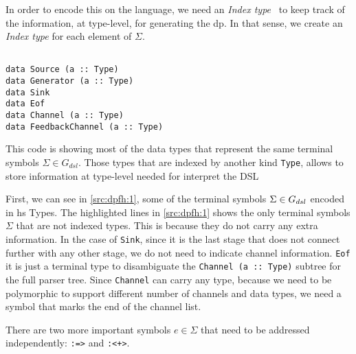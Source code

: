 In order to encode this on the language, we need an \emph{Index type}~\cite{type-index} to keep track of the information, at type-level, for generating the \acrshort{dp}. 
In that sense, we create an \emph{Index type} for each element of $\Sigma$.

\begin{listing}[htp!]
  \begin{verbatim}

data Source (a :: Type)
data Generator (a :: Type)
data Sink
data Eof
data Channel (a :: Type)
data FeedbackChannel (a :: Type)

  \end{verbatim}
  \caption[{[\texttt{Flow.hs}] $\Sigma$ enconding of $G_{dsl}$}]{This code is showing most of the data types that represent the same terminal symbols $\Sigma \in G_{dsl}$. Those types that are indexed by another kind \texttt{Type}, allows to store information at type-level needed for interpret the DSL}
  \label{src:dpfh:1}
\end{listing}
  
First, we can see in \autoref{src:dpfh:1}, some of the terminal symbols $\Sigma \in G_{dsl}$ encoded in \acrshort{hs} Types.
The highlighted lines in \autoref{src:dpfh:1} shows the only terminal symbols $\Sigma$ that are not indexed types. This is because they do not carry any extra information. 
In the case of \texttt{Sink}, since it is the last stage that does not connect further with any other stage, we do not need to indicate channel information. 
\texttt{Eof} it is just a terminal type to disambiguate the \texttt{Channel (a :: Type)} subtree for the full parser tree. Since \texttt{Channel} can carry any type, 
because we need to be polymorphic to support different number of channels and data types, we need a symbol that marks the end of the channel list.

There are two more important symbols $e \in \Sigma$ that need to be addressed independently: \texttt{:=>} and \texttt{:<+>}.

